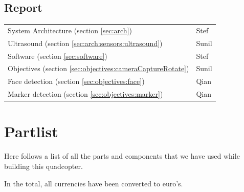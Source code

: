 \documentclass[11pt, a4paper, onecolumn, oneside, parskip=half]{scrartcl}
\begin{document}
\subsection{Report}
\begin{tabular}{ll}
System Architecture (section \ref{sec:arch}) & Stef \\
Ultrasound (section \ref{sec:arch:sensors:ultrasound}) & Sunil \\
Software (section \ref{sec:software}) & Stef \\
Objectives (section \ref{sec:objectives:cameraCaptureRotate}) & Sunil \\
Face detection (section \ref{sec:objectives:face}) & Qian \\
Marker detection (section \ref{sec:objectives:marker}) & Qian \\
\end{tabular}

\newpage
\section{Partlist}
Here follows a list of all the parts and components that we have used while building this quadcopter.

In the total, all currencies have been converted to euro's.
\end{document}
